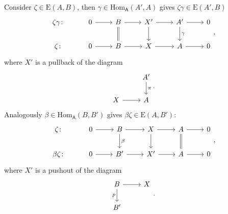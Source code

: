 \begin{rem}[]
	Consider $\zeta \in \mathrm{E}(A,B)$,
	then $\gamma \in \mathrm{Hom}_{\mathsf{A}} \left( A', A \right)$
	gives $\zeta\gamma \in \mathrm{E}(A',B)$
	\begin{equation}
	\begin{tikzcd}
		\zeta\gamma\colon &
		0 \arrow[r, "", rightarrow] &
		B \arrow[r, "", rightarrow] \arrow[d, "", equal] &
		X' \arrow[r, "", rightarrow] \arrow[d, "", rightarrow] &
		A' \arrow[r, "", rightarrow] \arrow[d, "\gamma", rightarrow] &
		0\\
		\zeta\colon &
		0 \arrow[r, "", rightarrow] &
		B \arrow[r, "", rightarrow] &
		X \arrow[r, "", rightarrow] &
		A \arrow[r, "", rightarrow] &
		0
	\end{tikzcd}
	,\end{equation} 
	where $X'$ is a pullback of the diagram
	\begin{equation}
	\begin{tikzcd}
		& A' \arrow[d, "\pi", rightarrow] \\
		X \arrow[r, "", rightarrow] & A
	\end{tikzcd}
	.\end{equation} 
	Analogously $\beta \in \mathrm{Hom}_{\mathsf{A}} \left( B, B' \right)$ gives
	$\beta\zeta \in \mathrm{E}(A,B')$:
	\begin{equation}
	\begin{tikzcd}
		\zeta\colon &
		0 \arrow[r, "", rightarrow] &
		B \arrow[r, "", rightarrow] \arrow[d, "\beta", rightarrow] &
		X \arrow[r, "", rightarrow] \arrow[d, "", rightarrow] &
		A \arrow[r, "", rightarrow] \arrow[d, "", equal] &
		0\\
		\beta\zeta\colon &
		0 \arrow[r, "", rightarrow] &
		B' \arrow[r, "", rightarrow] &
		X' \arrow[r, "", rightarrow] &
		A \arrow[r, "", rightarrow] &
		0
	\end{tikzcd}
	,\end{equation} 
	where $X'$ is a pushout of the diagram
	\begin{equation}
	\begin{tikzcd}
		B \arrow[r, "", rightarrow] \arrow[d, "p"', rightarrow] & X\\
		B' &
	\end{tikzcd}
	.\end{equation} 
\end{rem}

